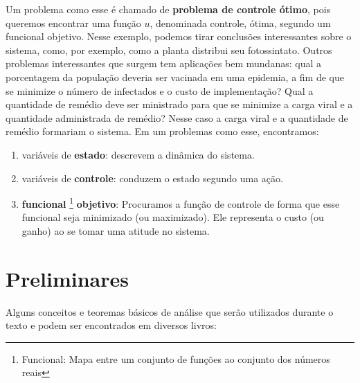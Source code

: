 Um problema como esse é chamado de \textbf{problema de controle ótimo}, pois
queremos encontrar uma função $u$, denominada controle, ótima, segundo um
funcional objetivo. Nesse exemplo, podemos tirar conclusões interessantes
sobre o sistema, como, por exemplo, como a planta distribui seu fotossintato.
Outros problemas interessantes que surgem tem aplicações bem mundanas: qual a
porcentagem da população deveria ser vacinada em uma epidemia, a fim de que se
minimize o número de infectados e o custo de implementação? Qual a quantidade
de remédio deve ser ministrado para que se minimize a carga viral e a
quantidade administrada de remédio? Nesse caso a carga viral e a quantidade de
remédio formariam o sistema.  
Em um problemas como esse, encontramos: 
\begin{enumerate}
    \item variáveis de \textbf{estado}: descrevem a dinâmica do sistema. 
    \item variáveis de \textbf{controle}: conduzem o estado segundo uma ação. 
    \item \textbf{funcional} \footnote{Funcional: Mapa entre um conjunto de funções ao
    conjunto dos números reais} \textbf{objetivo}: Procuramos a função de
    controle de forma que esse funcional seja minimizado (ou maximizado). Ele
    representa o custo (ou ganho) ao se tomar uma atitude no sistema. 
\end{enumerate}

\section{Preliminares}

Alguns conceitos e teoremas básicos de análise que serão utilizados durante o texto e
podem ser encontrados em diversos livros: 

